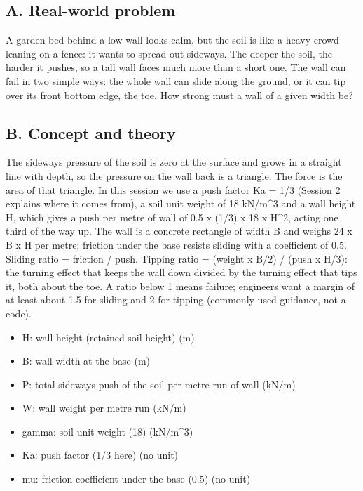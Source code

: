 \documentclass[11pt,a4paper]{article}
\begin{document}
\subsection*{A. Real-world problem}
A garden bed behind a low wall looks calm, but the soil is like a heavy crowd leaning on a fence: it wants to spread out sideways. The deeper the soil, the harder it pushes, so a tall wall faces much more than a short one. The wall can fail in two simple ways: the whole wall can slide along the ground, or it can tip over its front bottom edge, the toe. How strong must a wall of a given width be?

\subsection*{B. Concept and theory}
The sideways pressure of the soil is zero at the surface and grows in a straight line with depth, so the pressure on the wall back is a triangle. The force is the area of that triangle. In this session we use a push factor Ka = 1/3 (Session 2 explains where it comes from), a soil unit weight of 18 kN/m\textasciicircum{}3 and a wall height H, which gives a push per metre of wall of 0.5 x (1/3) x 18 x H\textasciicircum{}2, acting one third of the way up. The wall is a concrete rectangle of width B and weighs 24 x B x H per metre; friction under the base resists sliding with a coefficient of 0.5. Sliding ratio = friction / push. Tipping ratio = (weight x B/2) / (push x H/3): the turning effect that keeps the wall down divided by the turning effect that tips it, both about the toe. A ratio below 1 means failure; engineers want a margin of at least about 1.5 for sliding and 2 for tipping (commonly used guidance, not a code).

\begin{itemize}[nosep]
\item H: wall height (retained soil height) (m)
\item B: wall width at the base (m)
\item P: total sideways push of the soil per metre run of wall (kN/m)
\item W: wall weight per metre run (kN/m)
\item gamma: soil unit weight (18) (kN/m\textasciicircum{}3)
\item Ka: push factor (1/3 here) (no unit)
\item mu: friction coefficient under the base (0.5) (no unit)
\end{itemize}
\end{document}
